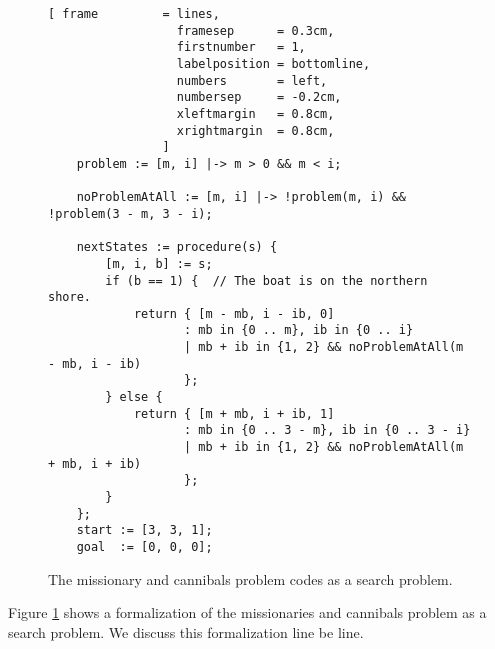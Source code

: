 \begin{figure}[!ht]
\centering
\begin{Verbatim}[ frame         = lines, 
                  framesep      = 0.3cm, 
                  firstnumber   = 1,
                  labelposition = bottomline,
                  numbers       = left,
                  numbersep     = -0.2cm,
                  xleftmargin   = 0.8cm,
                  xrightmargin  = 0.8cm,
                ]
    problem := [m, i] |-> m > 0 && m < i;

    noProblemAtAll := [m, i] |-> !problem(m, i) && !problem(3 - m, 3 - i);

    nextStates := procedure(s) {
        [m, i, b] := s;
        if (b == 1) {  // The boat is on the northern shore.
            return { [m - mb, i - ib, 0]
                   : mb in {0 .. m}, ib in {0 .. i}           
                   | mb + ib in {1, 2} && noProblemAtAll(m - mb, i - ib)
                   };
        } else {
            return { [m + mb, i + ib, 1]
                   : mb in {0 .. 3 - m}, ib in {0 .. 3 - i}           
                   | mb + ib in {1, 2} && noProblemAtAll(m + mb, i + ib)
                   };
        }
    };
    start := [3, 3, 1];
    goal  := [0, 0, 0];
\end{Verbatim}
\vspace*{-0.3cm}
\caption{The missionary and cannibals problem codes as a search problem.}
\label{fig:missionaries.stlx}
\end{figure}
\noindent
Figure \ref{fig:missionaries.stlx} shows a formalization of the missionaries and cannibals problem
as a search problem.  We discuss this formalization line be line.
